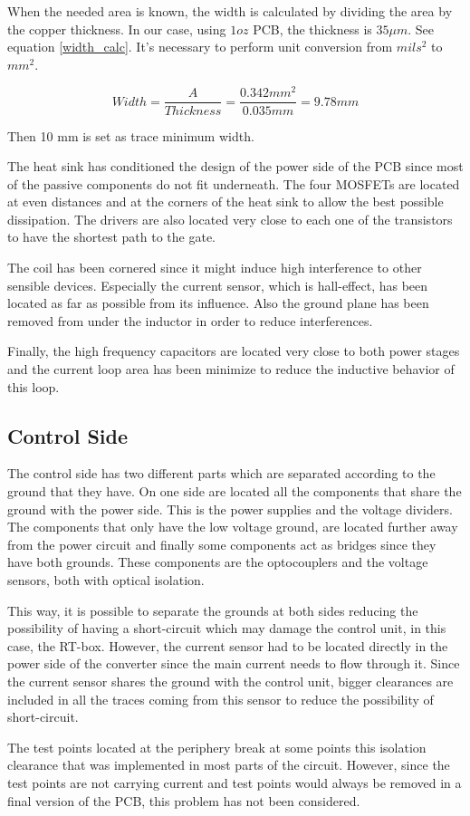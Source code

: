 When the needed area is known, the width is calculated by dividing the area by the copper thickness. In our case, using $1 oz$ PCB, the thickness is $35 \mu m$. See equation \ref{width_calc}. It's necessary to perform unit conversion from $mils^2$ to $mm^2$.

\begin{equation} \label{width_calc}
Width = \frac{A}{Thickness} = \frac{0.342 mm^2}{0.035 mm} = 9.78 mm
\end{equation}

Then 10 mm is set as trace minimum width.


The heat sink has conditioned the design of the power side of the PCB since most of the passive components do not fit underneath. The four MOSFETs are located at even distances and at the corners of the heat sink to allow the best possible dissipation. The drivers are also located very close to each one of the transistors to have the shortest path to the gate.

The coil has been cornered since it might induce high interference to other sensible devices. Especially the current sensor, which is hall-effect, has been located as far as possible from its influence. Also the ground plane has been removed from under the inductor in order to reduce interferences.

Finally, the high frequency capacitors are located very close to both power stages and the current loop area has been minimize to reduce the inductive behavior of this loop. 

\subsection{Control Side} \label{PCB_Control}
The control side has two different parts which are separated according to the ground that they have. On one side are located all the components that share the ground with the power side. This is the power supplies and the voltage dividers. The components that only have the low voltage ground, are located further away from the power circuit and finally some components act as bridges since they have both grounds. These components are the optocouplers and the voltage sensors, both with optical isolation.
 
This way, it is possible to separate the grounds at both sides reducing the possibility of having a short-circuit which may damage the control unit, in this case, the RT-box. However, the current sensor had to be located directly in the power side of the converter since the main current needs to flow through it. Since the current sensor shares the ground with the control unit, bigger clearances are included in all the traces coming from this sensor to reduce the possibility of short-circuit. 

The test points located at the periphery break at some points this isolation clearance that was implemented in most parts of the circuit. However, since the test points are not carrying current and test points would always be removed in a final version of the PCB, this problem has not been considered.